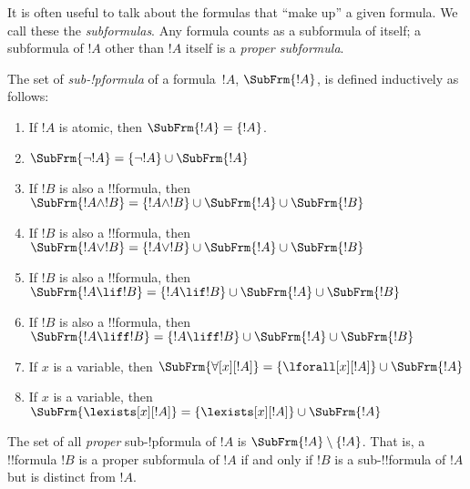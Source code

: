 \documentclass[../../include/open-logic-section]{subfiles}
\begin{document}


\begin{explain}
It is often useful to talk about the formulas that ``make up'' a given
formula.  We call these the \emph{subformulas}.  Any formula counts as
a subformula of itself; a subformula of $!A$ other than $!A$ itself is
a \emph{proper subformula}.
\end{explain}

\begin{defn}
The set of \emph{sub-!p{formula}} of a formula~$!A$,
$\SubFrm{!A}$, is defined inductively as follows:
\begin{enumerate}
\item If $!A$ is atomic, then $\SubFrm{!A} = \{!A\}$.
\item $\SubFrm{\lnot !A} = \{\lnot !A\} \cup \SubFrm{!A}$
\item If $!B$ is also a !!{formula}, then $\SubFrm{!A \land !B} = \{!A
  \land !B\} \cup \SubFrm{!A} \cup \SubFrm{!B}$
\item If $!B$ is also a !!{formula}, then $\SubFrm{!A \lor !B} = \{!A \lor
  !B\} \cup \SubFrm{!A} \cup \SubFrm{!B}$
\item If $!B$ is also a !!{formula}, then $\SubFrm{!A \lif !B} = \{!A \lif
  !B\} \cup \SubFrm{!A} \cup \SubFrm{!B}$
\item If $!B$ is also a !!{formula}, then $\SubFrm{!A \liff !B} = \{!A
  \liff !B\} \cup \SubFrm{!A} \cup \SubFrm{!B}$
\item If $x$ is a variable, then $\SubFrm{\forall[x][!A]} =
  \{\lforall[x][!A]\} \cup \SubFrm{!A}$
\item If $x$ is a variable, then $\SubFrm{\lexists[x][!A]} =
  \{\lexists[x][!A]\} \cup \SubFrm{!A}$
\end{enumerate}
The set of all \emph{proper} sub-!p{formula} of $!A$ is $\SubFrm{!A} \setminus
\{!A\}$. That is, a !!{formula} $!B$ is a proper subformula of $!A$ if and
only if $!B$ is a sub-!!{formula} of $!A$ but is distinct from $!A$.
\end{defn}

\end{document}
